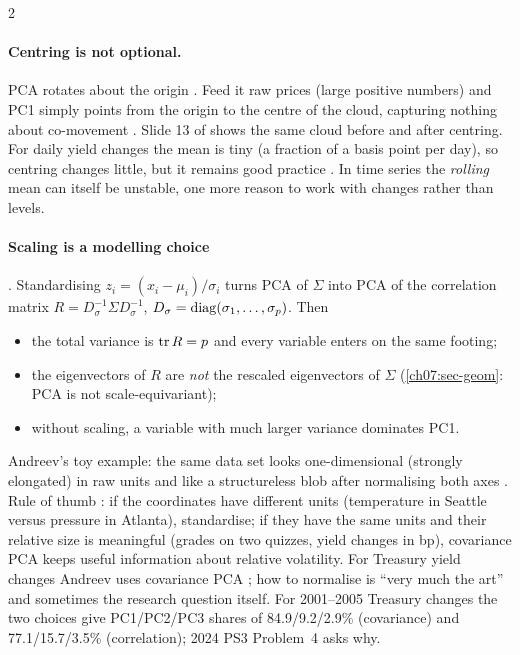 \begin{paracol}{2}
\paragraph{Centring is not optional.} PCA rotates about the origin . Feed it raw prices
(large positive numbers) and PC1 simply points from the origin to the centre of the cloud, capturing
nothing about co-movement . Slide 13 of  shows the same cloud before and after
centring. For daily yield changes the mean is tiny (a fraction of a basis point per day), so centring changes
little, but it remains good practice . In time series the \emph{rolling} mean can itself be
unstable, one more reason to work with changes rather than levels.

\paragraph{Scaling is a modelling choice} . Standardising $z_i=(x_i-\mu_i)/\sigma_i$ turns PCA of
$\Sigma$ into PCA of the correlation matrix $R=D_\sigma^{-1}\Sigma D_\sigma^{-1}$, $D_\sigma=\operatorname{diag}(\sigma_1,\dots,\sigma_p)$. Then
\begin{itemize}
  \item the total variance is $\operatorname{tr} R=p$ and every variable enters on the same footing;
  \item the eigenvectors of $R$ are \emph{not} the rescaled eigenvectors of $\Sigma$ (\cref{ch07:sec-geom}:
        PCA is not scale-equivariant);
  \item without scaling, a variable with much larger variance dominates PC1.
\end{itemize}
Andreev's toy example: the same data set looks one-dimensional (strongly elongated) in raw units and like
a structureless blob after normalising both axes . Rule of thumb : if the
coordinates have different units (temperature in Seattle versus pressure in Atlanta), standardise; if they
have the same units and their relative size is meaningful (grades on two quizzes, yield changes in bp),
covariance PCA keeps useful information about relative volatility. For Treasury yield changes Andreev uses
covariance PCA ; how to normalise is ``very much the art'' and sometimes the research
question itself. For 2001--2005 Treasury changes the two choices give PC1/PC2/PC3 shares of
84.9/9.2/2.9\% (covariance) and 77.1/15.7/3.5\% (correlation); 2024 PS3 Problem~4 asks why.


\end{paracol}
